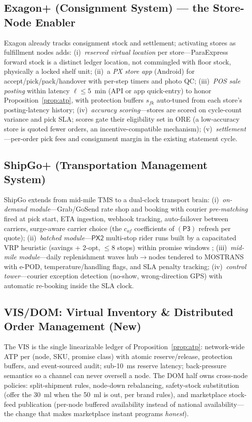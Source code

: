 \documentclass[journal]{IEEEtran}
\begin{document}
\subsection{Exagon+ (Consignment System) --- the Store-Node Enabler}
Exagon already tracks consignment stock and settlement; activating stores as fulfillment nodes adds: (i)~\emph{reserved virtual location} per store---ParaExpress forward stock is a distinct ledger location, not commingled with floor stock, physically a locked shelf unit; (ii)~a \emph{PX store app} (Android) for accept/pick/pack/handover with per-step timers and photo QC; (iii)~\emph{POS sale posting} within latency $\ell \le 5$~min (API or app quick-entry) to honor Proposition~\ref{prop:atp}, with protection buffers $s_{fk}$ auto-tuned from each store's posting-latency history; (iv)~\emph{accuracy scoring}---stores are scored on cycle-count variance and pick SLA; scores gate their eligibility set in ORE (a low-accuracy store is quoted fewer orders, an incentive-compatible mechanism); (v)~\emph{settlement}---per-order pick fees and consignment margin in the existing statement cycle.

\subsection{ShipGo+ (Transportation Management System)}
ShipGo extends from mid-mile TMS to a dual-clock transport brain: (i)~\emph{on-demand module}---Grab/GoSend rate shop and booking with courier \emph{pre-matching} fired at pick start, ETA ingestion, webhook tracking, auto-failover between carriers, surge-aware carrier choice (the $c_{of}$ coefficients of $(\mathsf{P3})$ refresh per quote); (ii)~\emph{batched module}---$\mathsf{PX2}$ multi-stop rider runs built by a capacitated VRP heuristic (savings + 2-opt, $\le$8 stops) within promise windows \cite{tothvigo,klapp}; (iii)~\emph{mid-mile module}---daily replenishment waves hub$\to$nodes tendered to MOSTRANS with e-POD, temperature/handling flags, and SLA penalty tracking; (iv)~\emph{control tower}---courier exception detection (no-show, wrong-direction GPS) with automatic re-booking inside the SLA clock.

\subsection{VIS/DOM: Virtual Inventory \& Distributed Order Management (New)}
The VIS is the single linearizable ledger of Proposition~\ref{prop:atp}: network-wide ATP per (node, SKU, promise class) with atomic reserve/release, protection buffers, and event-sourced audit; sub-10~ms reserve latency; back-pressure semantics so a channel can never oversell a node. The DOM half owns cross-node policies: split-shipment rules, node-down rebalancing, safety-stock substitution (offer the 30~ml when the 50~ml is out, per brand rules), and marketplace stock-feed publication (per-node buffered availability instead of national availability---the change that makes marketplace instant programs \emph{honest}).
\end{document}
